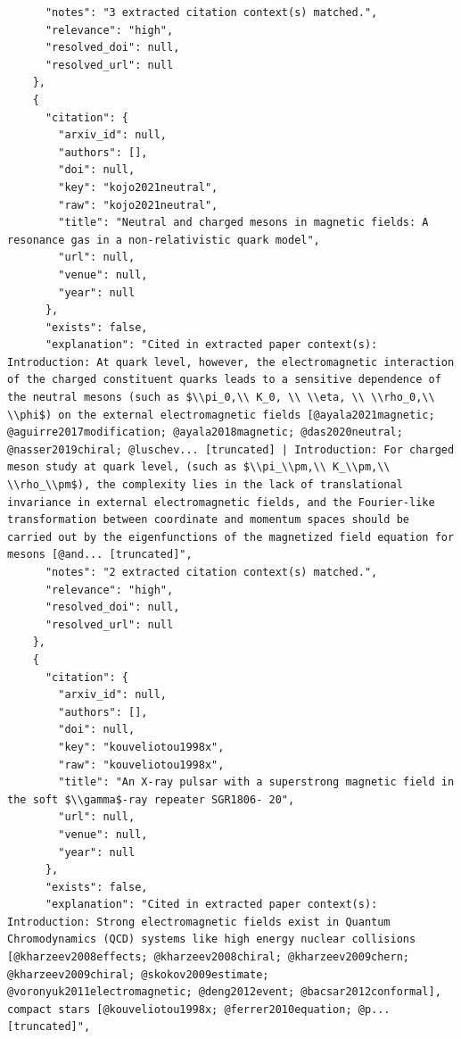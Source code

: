 \documentclass[11pt]{article}
\begin{document}
\begin{verbatim}
      "notes": "3 extracted citation context(s) matched.",
      "relevance": "high",
      "resolved_doi": null,
      "resolved_url": null
    },
    {
      "citation": {
        "arxiv_id": null,
        "authors": [],
        "doi": null,
        "key": "kojo2021neutral",
        "raw": "kojo2021neutral",
        "title": "Neutral and charged mesons in magnetic fields: A resonance gas in a non-relativistic quark model",
        "url": null,
        "venue": null,
        "year": null
      },
      "exists": false,
      "explanation": "Cited in extracted paper context(s): Introduction: At quark level, however, the electromagnetic interaction of the charged constituent quarks leads to a sensitive dependence of the neutral mesons (such as $\\pi_0,\\ K_0, \\ \\eta, \\ \\rho_0,\\ \\phi$) on the external electromagnetic fields [@ayala2021magnetic; @aguirre2017modification; @ayala2018magnetic; @das2020neutral; @nasser2019chiral; @luschev... [truncated] | Introduction: For charged meson study at quark level, (such as $\\pi_\\pm,\\ K_\\pm,\\ \\rho_\\pm$), the complexity lies in the lack of translational invariance in external electromagnetic fields, and the Fourier-like transformation between coordinate and momentum spaces should be carried out by the eigenfunctions of the magnetized field equation for mesons [@and... [truncated]",
      "notes": "2 extracted citation context(s) matched.",
      "relevance": "high",
      "resolved_doi": null,
      "resolved_url": null
    },
    {
      "citation": {
        "arxiv_id": null,
        "authors": [],
        "doi": null,
        "key": "kouveliotou1998x",
        "raw": "kouveliotou1998x",
        "title": "An X-ray pulsar with a superstrong magnetic field in the soft $\\gamma$-ray repeater SGR1806- 20",
        "url": null,
        "venue": null,
        "year": null
      },
      "exists": false,
      "explanation": "Cited in extracted paper context(s): Introduction: Strong electromagnetic fields exist in Quantum Chromodynamics (QCD) systems like high energy nuclear collisions [@kharzeev2008effects; @kharzeev2008chiral; @kharzeev2009chern; @kharzeev2009chiral; @skokov2009estimate; @voronyuk2011electromagnetic; @deng2012event; @bacsar2012conformal], compact stars [@kouveliotou1998x; @ferrer2010equation; @p... [truncated]",

\end{verbatim}
\end{document}
